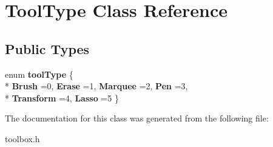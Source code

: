 \hypertarget{class_tool_type}{\section{Tool\-Type Class Reference}
\label{class_tool_type}
}
\subsection*{Public Types}
\begin{DoxyCompactItemize}
\item 
enum {\bfseries tool\-Type} \{ \\*
{\bfseries Brush} =0, 
{\bfseries Erase} =1, 
{\bfseries Marquee} =2, 
{\bfseries Pen} =3, 
\\*
{\bfseries Transform} =4, 
{\bfseries Lasso} =5
 \}
\end{DoxyCompactItemize}


The documentation for this class was generated from the following file\-:\begin{DoxyCompactItemize}
\item 
toolbox.\-h\end{DoxyCompactItemize}
